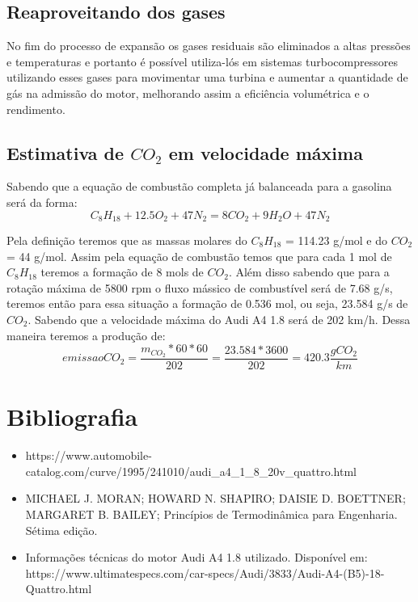 \documentclass[a4paper]{article}
\begin{document}
\subsection{Reaproveitando dos gases}

No fim do processo de expansão os gases residuais são eliminados a altas pressões e temperaturas e portanto é possível utiliza-lós em sistemas turbocompressores utilizando esses gases para movimentar uma turbina e aumentar a quantidade de gás na admissão do motor, melhorando assim a eficiência volumétrica e o rendimento.


\subsection{Estimativa de $CO_{2}$ em velocidade máxima}
Sabendo que a equação de combustão completa já balanceada para a gasolina será da forma:
\begin{equation*}
    C_{8}H_{18} + 12.5O_{2} + 47N_{2} = 8CO_{2} + 9H_{2}O + 47N_{2}
\end{equation*}

Pela definição teremos que as massas molares do $C_{8}H_{18}$ = 114.23 g/mol e do $CO_{2}$ = 44 g/mol. Assim pela equação de combustão temos que para cada 1 mol de $C_{8}H_{18}$ teremos a formação de 8 mols de $CO_{2}$. Além disso sabendo que para a rotação máxima de 5800 rpm o fluxo mássico de combustível será de 7.68 g/s, teremos então para essa situação a formação de 0.536 mol, ou seja, 23.584 g/s de $CO_{2}$. Sabendo que a velocidade máxima do Audi A4 1.8 será de 202 km/h. Dessa maneira teremos a produção de:\\
\begin{equation*}
    emissaoCO_{2} = \frac{m_{CO_{2}}*60*60}{202} = \frac{23.584*3600}{202}  = 420.3  \frac{gCO_{2}}{km}
\end{equation*} 


\newpage
\section{Bibliografia}
\begin{itemize}
    \item https://www.automobile-catalog.com/curve/1995/241010/audi_a4_1_8_20v_quattro.html
    \item MICHAEL J. MORAN; HOWARD N. SHAPIRO; DAISIE D. BOETTNER; MARGARET B. BAILEY; Princípios de Termodinâmica para Engenharia. Sétima edição.
    \item Informações técnicas do motor Audi A4 1.8 utilizado. Disponível em: https://www.ultimatespecs.com/car-specs/Audi/3833/Audi-A4-(B5)-18-Quattro.html
    
    
\end{itemize}
\end{document}
